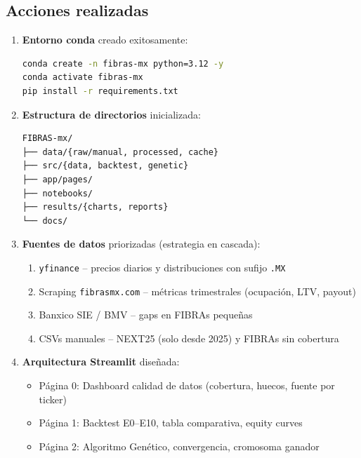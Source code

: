\documentclass[12pt, a4paper]{article}
\begin{document}
\subsection{Acciones realizadas}

\begin{enumerate}
  \item \textbf{Entorno conda} creado exitosamente:
\begin{lstlisting}[language=bash]
conda create -n fibras-mx python=3.12 -y
conda activate fibras-mx
pip install -r requirements.txt
\end{lstlisting}

  \item \textbf{Estructura de directorios} inicializada:
\begin{lstlisting}
FIBRAS-mx/
├── data/{raw/manual, processed, cache}
├── src/{data, backtest, genetic}
├── app/pages/
├── notebooks/
├── results/{charts, reports}
└── docs/
\end{lstlisting}

  \item \textbf{Fuentes de datos} priorizadas (estrategia en cascada):
  \begin{enumerate}[label=\arabic*.]
    \item \texttt{yfinance} -- precios diarios y distribuciones con sufijo \texttt{.MX}
    \item Scraping \texttt{fibrasmx.com} -- m\'{e}tricas trimestrales (ocupaci\'{o}n, LTV, payout)
    \item Banxico SIE / BMV -- gaps en FIBRAs peque\~{n}as
    \item CSVs manuales -- NEXT25 (solo desde 2025) y FIBRAs sin cobertura
  \end{enumerate}

  \item \textbf{Arquitectura Streamlit} dise\~{n}ada:
  \begin{itemize}
    \item P\'{a}gina 0: Dashboard calidad de datos (cobertura, huecos, fuente por ticker)
    \item P\'{a}gina 1: Backtest E0--E10, tabla comparativa, equity curves
    \item P\'{a}gina 2: Algoritmo Gen\'{e}tico, convergencia, cromosoma ganador
  \end{itemize}
\end{enumerate}
\end{document}
